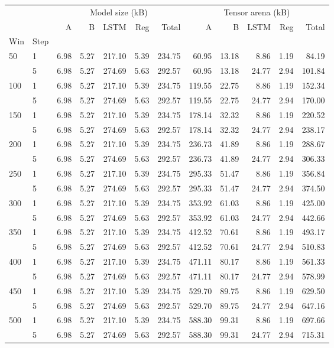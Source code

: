 \begin{tabular}{llrrrrrrrrrr}
\toprule
 &  & \multicolumn{5}{c}{Model size (kB)} & \multicolumn{5}{c}{Tensor arena (kB)} \\
 &  & A & B & LSTM & Reg & Total & A & B & LSTM & Reg & Total \\
Win & Step &  &  &  &  &  &  &  &  &  &  \\
\midrule
\multirow[t]{2}{*}{50} & 1 & 6.98 & 5.27 & 217.10 & 5.39 & 234.75 & 60.95 & 13.18 & 8.86 & 1.19 & 84.19 \\
 & 5 & 6.98 & 5.27 & 274.69 & 5.63 & 292.57 & 60.95 & 13.18 & 24.77 & 2.94 & 101.84 \\
\cline{1-12}
\multirow[t]{2}{*}{100} & 1 & 6.98 & 5.27 & 217.10 & 5.39 & 234.75 & 119.55 & 22.75 & 8.86 & 1.19 & 152.34 \\
 & 5 & 6.98 & 5.27 & 274.69 & 5.63 & 292.57 & 119.55 & 22.75 & 24.77 & 2.94 & 170.00 \\
\cline{1-12}
\multirow[t]{2}{*}{150} & 1 & 6.98 & 5.27 & 217.10 & 5.39 & 234.75 & 178.14 & 32.32 & 8.86 & 1.19 & 220.52 \\
 & 5 & 6.98 & 5.27 & 274.69 & 5.63 & 292.57 & 178.14 & 32.32 & 24.77 & 2.94 & 238.17 \\
\cline{1-12}
\multirow[t]{2}{*}{200} & 1 & 6.98 & 5.27 & 217.10 & 5.39 & 234.75 & 236.73 & 41.89 & 8.86 & 1.19 & 288.67 \\
 & 5 & 6.98 & 5.27 & 274.69 & 5.63 & 292.57 & 236.73 & 41.89 & 24.77 & 2.94 & 306.33 \\
\cline{1-12}
\multirow[t]{2}{*}{250} & 1 & 6.98 & 5.27 & 217.10 & 5.39 & 234.75 & 295.33 & 51.47 & 8.86 & 1.19 & 356.84 \\
 & 5 & 6.98 & 5.27 & 274.69 & 5.63 & 292.57 & 295.33 & 51.47 & 24.77 & 2.94 & 374.50 \\
\cline{1-12}
\multirow[t]{2}{*}{300} & 1 & 6.98 & 5.27 & 217.10 & 5.39 & 234.75 & 353.92 & 61.03 & 8.86 & 1.19 & 425.00 \\
 & 5 & 6.98 & 5.27 & 274.69 & 5.63 & 292.57 & 353.92 & 61.03 & 24.77 & 2.94 & 442.66 \\
\cline{1-12}
\multirow[t]{2}{*}{350} & 1 & 6.98 & 5.27 & 217.10 & 5.39 & 234.75 & 412.52 & 70.61 & 8.86 & 1.19 & 493.17 \\
 & 5 & 6.98 & 5.27 & 274.69 & 5.63 & 292.57 & 412.52 & 70.61 & 24.77 & 2.94 & 510.83 \\
\cline{1-12}
\multirow[t]{2}{*}{400} & 1 & 6.98 & 5.27 & 217.10 & 5.39 & 234.75 & 471.11 & 80.17 & 8.86 & 1.19 & 561.33 \\
 & 5 & 6.98 & 5.27 & 274.69 & 5.63 & 292.57 & 471.11 & 80.17 & 24.77 & 2.94 & 578.99 \\
\cline{1-12}
\multirow[t]{2}{*}{450} & 1 & 6.98 & 5.27 & 217.10 & 5.39 & 234.75 & 529.70 & 89.75 & 8.86 & 1.19 & 629.50 \\
 & 5 & 6.98 & 5.27 & 274.69 & 5.63 & 292.57 & 529.70 & 89.75 & 24.77 & 2.94 & 647.16 \\
\cline{1-12}
\multirow[t]{2}{*}{500} & 1 & 6.98 & 5.27 & 217.10 & 5.39 & 234.75 & 588.30 & 99.31 & 8.86 & 1.19 & 697.66 \\
 & 5 & 6.98 & 5.27 & 274.69 & 5.63 & 292.57 & 588.30 & 99.31 & 24.77 & 2.94 & 715.31 \\
\cline{1-12}
\bottomrule
\end{tabular}
